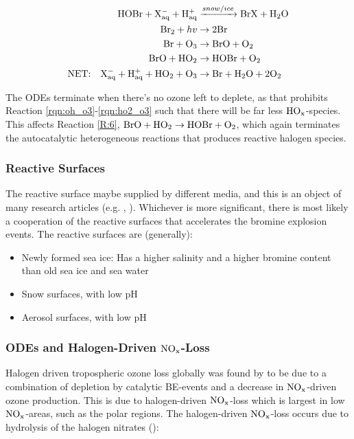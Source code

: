 \begin{align*}
    \mathrm{HOBr} + \mathrm{X^-_{aq}} + \mathrm{H^+_{aq}} &\xrightarrow{snow/ice} \mathrm{BrX} + \mathrm{H_2O} \\
    \mathrm{Br_2} + hv &\rightarrow 2\mathrm{Br} \\
    \mathrm{Br} + \mathrm{O_3} &\rightarrow \mathrm{BrO} + \mathrm{O_2} \\
    \mathrm{BrO} + \mathrm{HO_2} &\rightarrow \mathrm{HOBr} + \mathrm{O_2} \\
    \text{NET:} \quad \mathrm{X^-_{aq}} + \mathrm{H^+_{aq}} + \mathrm{HO_2} + \mathrm{O_3}  &\rightarrow \mathrm{Br} + \mathrm{H_2O} + 2\mathrm{O_2} 
\end{align*}

\medskip

The ODEs terminate when there's no ozone left to deplete, as that prohibits Reaction \ref{rqn:oh_o3}-\ref{rqn:ho2_o3} such that there will be far less $\mathrm{HO_x}$-species. This affects Reaction \ref{R:6}, $\mathrm{BrO} + \mathrm{HO_2} \rightarrow \mathrm{HOBr} + \mathrm{O_2}$, which again terminates the autocatalytic heterogeneous reactions that produces reactive halogen species. 

\subsubsection{Reactive Surfaces}

The reactive surface maybe supplied by different media, and this is an object of many research articles (e.g.  \cite{Simpson2018}, \cite{Rankin}). Whichever is more significant, there is most likely a cooperation of the reactive surfaces that accelerates the bromine explosion events. The reactive surfaces are (generally): 

\begin{itemize}
    \item Newly formed sea ice: Has a higher salinity and a higher bromine content than old sea ice and sea water \cite{Rankin}
    \item Snow surfaces, with low pH
    \item Aerosol surfaces, with low pH
\end{itemize}

\subsubsection{ODEs and Halogen-Driven $\mathrm{NO_x}$-Loss}

Halogen driven tropospheric ozone loss globally was found by \cite{Schmidt} to be due to a combination of depletion by catalytic BE-events and a decrease in $\mathrm{NO_x}$-driven ozone production. This is due to halogen-driven $\mathrm{NO_x}$-loss which is largest in low $\mathrm{NO_x}$-areas, such as the polar regions. The halogen-driven $\mathrm{NO_x}$-loss occurs due to hydrolysis of the halogen nitrates (\cite{Schmidt}):

